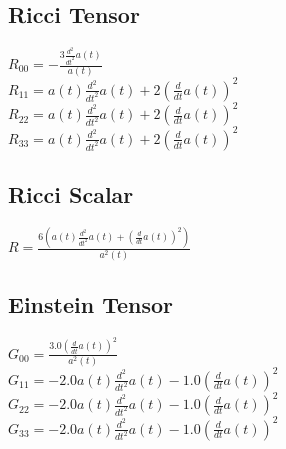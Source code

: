 \documentclass{article}
\begin{document}
\subsection*{Ricci Tensor}
$R_{00} = - \frac{3 \frac{d^{2}}{d t^{2}} a{\left(t \right)}}{a{\left(t \right)}}$\\
$R_{11} = a{\left(t \right)} \frac{d^{2}}{d t^{2}} a{\left(t \right)} + 2 \left(\frac{d}{d t} a{\left(t \right)}\right)^{2}$\\
$R_{22} = a{\left(t \right)} \frac{d^{2}}{d t^{2}} a{\left(t \right)} + 2 \left(\frac{d}{d t} a{\left(t \right)}\right)^{2}$\\
$R_{33} = a{\left(t \right)} \frac{d^{2}}{d t^{2}} a{\left(t \right)} + 2 \left(\frac{d}{d t} a{\left(t \right)}\right)^{2}$\\
\subsection*{Ricci Scalar}
$R = \frac{6 \left(a{\left(t \right)} \frac{d^{2}}{d t^{2}} a{\left(t \right)} + \left(\frac{d}{d t} a{\left(t \right)}\right)^{2}\right)}{a^{2}{\left(t \right)}}$\\

\subsection*{Einstein Tensor}
$G_{00} = \frac{3.0 \left(\frac{d}{d t} a{\left(t \right)}\right)^{2}}{a^{2}{\left(t \right)}}$\\
$G_{11} = - 2.0 a{\left(t \right)} \frac{d^{2}}{d t^{2}} a{\left(t \right)} - 1.0 \left(\frac{d}{d t} a{\left(t \right)}\right)^{2}$\\
$G_{22} = - 2.0 a{\left(t \right)} \frac{d^{2}}{d t^{2}} a{\left(t \right)} - 1.0 \left(\frac{d}{d t} a{\left(t \right)}\right)^{2}$\\
$G_{33} = - 2.0 a{\left(t \right)} \frac{d^{2}}{d t^{2}} a{\left(t \right)} - 1.0 \left(\frac{d}{d t} a{\left(t \right)}\right)^{2}$\\
\end{document}
